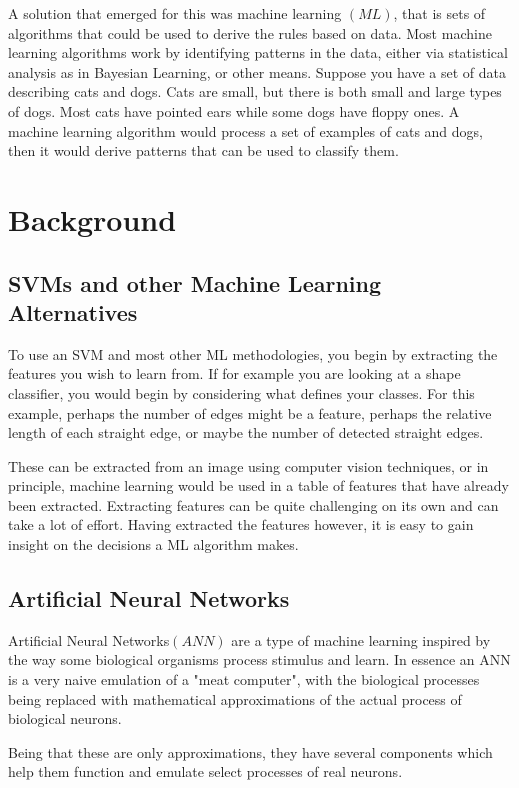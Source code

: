 A solution that emerged for this was machine learning $\left(ML\right)$, that is sets of algorithms that could be used to derive the rules based on data. Most machine learning algorithms work by identifying patterns in the data, either via statistical analysis as in Bayesian Learning, or other means. Suppose you have a set of data describing cats and dogs. Cats are small, but there is both small and large types of dogs. Most cats have pointed ears while some dogs have floppy ones. A machine learning algorithm would process a set of examples of cats and dogs, then it would derive patterns that can be used to classify them.

\section{Background}
\subsection{SVMs and other Machine Learning Alternatives}
To use an SVM and most other ML methodologies, you begin by extracting the features you wish to learn from. If for example you are looking at a shape classifier, you would begin by considering what defines your classes. For this example, perhaps the number of edges might be a feature, perhaps the relative length of each straight edge, or maybe the number of detected straight edges.

These can be extracted from an image using computer vision techniques, or in principle, machine learning would be used in a table of features that have already been extracted. Extracting features can be quite challenging on its own and can take a lot of effort. Having extracted the features however,  it is easy to gain insight on the decisions a ML algorithm makes.

\subsection {Artificial Neural Networks}
Artificial Neural Networks$\left(ANN\right)$ are a type of machine learning inspired by the way some biological organisms process stimulus and learn. In essence an ANN is a very naive emulation of a "meat computer", with the biological processes being replaced with mathematical approximations of the actual process of biological neurons.

Being that these are only approximations, they have several components which help them function and emulate select processes of real neurons.

